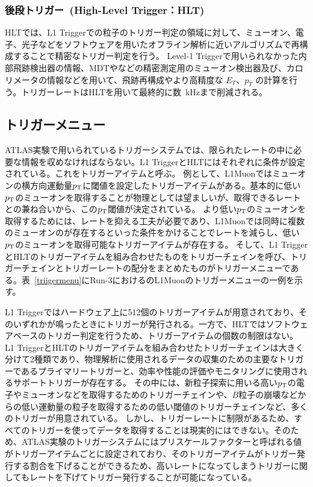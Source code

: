 \subsubsection{後段トリガー~(High-Level Trigger：HLT)}
HLTでは、L1 Triggerでの粒子のトリガー判定の領域に対して、ミューオン、電子、光子などをソフトウェアを用いたオフライン解析に近いアルゴリズムで再構成することで精密なトリガー判定を行う。
Level-1 Triggerで用いられなかった内部飛跡検出器の情報、MDTやなどの精密測定用のミューオン検出器及び、カロリメータの情報などを用いて、飛跡再構成やより高精度な $E_T$、$p_T$ の計算を行う。トリガーレートはHLTを用いて最終的に数~kHzまで削減される。

\subsection{トリガーメニュー}
ATLAS実験で用いられているトリガーシステムでは、限られたレートの中に必要な情報を収めなければならない。L1 TriggerとHLTにはそれぞれに条件が設定されている。これをトリガーアイテムと呼ぶ。
例として、L1Muonではミューオンの横方向運動量$p_{\rm{T}}$に閾値を設定したトリガーアイテムがある。基本的に低い$p_{\rm{T}}$のミューオンを取得することが物理としては望ましいが、取得できるレートとの兼ね合いから、この$p_{\rm{T}}$閾値が決定されている。
より低い$p_{\rm{T}}$のミューオンを取得するためには、レートを抑える工夫が必要であり、L1Muonでは同時に複数のミューオンのが存在するといった条件をかけることでレートを減らし、低い$p_{\rm{T}}$のミューオンを取得可能なトリガーアイテムが存在する。
そして、L1 TriggerとHLTのトリガーアイテムを組み合わせたものをトリガーチェインを呼び、トリガーチェインとトリガーレートの配分をまとめたものがトリガーメニューである。表~\ref{triigermenu}にRun-3におけるのL1Muonのトリガーメニューの一例を示す。

L1 Triggerではハードウェア上に512個のトリガーアイテムが用意されており、そのいずれかが鳴ったときにトリガーが発行される。一方で、HLTではソフトウェアベースのトリガー判定を行うため、トリガーアイテムの個数の制限はない。
L1 TriggerとHLTのトリガーアイテムを組み合わせたトリガーチェインは大きく分けて2種類であり、物理解析に使用されるデータの収集のための主要なトリガーであるプライマリートリガーと、効率や性能の評価やモニタリングに使用されるサポートトリガーが存在する。
その中には、新粒子探索に用いる高い$p_{\rm{T}}$の電子やミューオンなどを取得するためのトリガーチェインや、$B$粒子の崩壊などからの低い運動量の粒子を取得するための低い閾値のトリガーチェインなど、多くのトリガーが用意されている。
しかし、トリガーレートに制限があるため、すべてのトリガーを使ってデータを取得することは現実的にはできない。そのため、ATLAS実験のトリガーシステムにはプリスケールファクターと呼ばれる値がトリガーアイテムごとに設定されており、そのトリガーアイテムがトリガー発行する割合を下げることができるため、高いレートになってしまうトリガーに関してもレートを下げてトリガー発行することが可能になっている。

